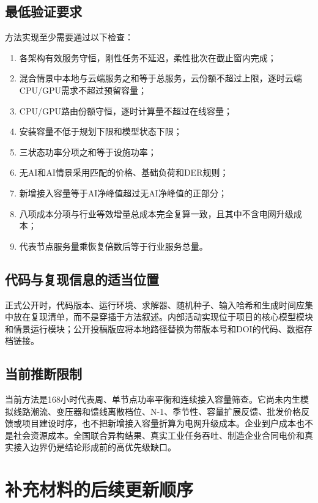 \documentclass[preprint]{elsarticle}
\begin{document}
\subsection{最低验证要求}

方法实现至少需要通过以下检查：

\begin{enumerate}
  \item 各架构有效服务守恒，刚性任务不延迟，柔性批次在截止窗内完成；
  \item 混合情景中本地与云端服务之和等于总服务，云份额不超过上限，逐时云端CPU/GPU需求不超过预留容量；
  \item CPU/GPU路由份额守恒，逐时计算量不超过在线容量；
  \item 安装容量不低于规划下限和模型状态下限；
  \item 三状态功率分项之和等于设施功率；
  \item 无AI和AI情景采用匹配的价格、基础负荷和DER规则；
  \item 新增接入容量等于AI净峰值超过无AI净峰值的正部分；
  \item 八项成本分项与行业等效增量总成本完全复算一致，且其中不含电网升级成本；
  \item 代表节点服务量乘恢复倍数后等于行业服务总量。
\end{enumerate}

\subsection{代码与复现信息的适当位置}

正式公开时，代码版本、运行环境、求解器、随机种子、输入哈希和生成时间应集中放在复现清单，而不是穿插于方法叙述。内部活动实现位于项目的核心模型模块和情景运行模块；公开投稿版应将本地路径替换为带版本号和DOI的代码、数据存档链接。

\subsection{当前推断限制}

当前方法是168小时代表周、单节点功率平衡和连续接入容量筛查。它尚未内生模拟线路潮流、变压器和馈线离散档位、N-1、季节性、容量扩展反馈、批发价格反馈或项目建设时序，也不把新增接入容量折算为电网升级成本。企业到户成本也不是社会资源成本。全国联合异构结果、真实工业任务吞吐、制造企业合同电价和真实接入边界仍是结论形成前的高优先级缺口。

\section{补充材料的后续更新顺序}
\end{document}
